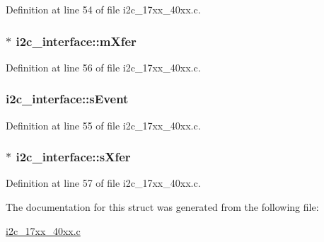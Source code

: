 Definition at line 54 of file i2c\+\_\+17xx\+\_\+40xx.\+c.

\subsubsection[{\texorpdfstring{m\+Xfer}{mXfer}}]{$\ast$ i2c\+\_\+interface\+::m\+Xfer}\hypertarget{structi2c__interface_a8894534cc883275b847f183e6fe1e7e6}{}\label{structi2c__interface_a8894534cc883275b847f183e6fe1e7e6}


Definition at line 56 of file i2c\+\_\+17xx\+\_\+40xx.\+c.

\subsubsection[{\texorpdfstring{s\+Event}{sEvent}}]{ i2c\+\_\+interface\+::s\+Event}\hypertarget{structi2c__interface_aa0820cc1e59b1da898435b4813f5c58d}{}\label{structi2c__interface_aa0820cc1e59b1da898435b4813f5c58d}


Definition at line 55 of file i2c\+\_\+17xx\+\_\+40xx.\+c.

\subsubsection[{\texorpdfstring{s\+Xfer}{sXfer}}]{$\ast$ i2c\+\_\+interface\+::s\+Xfer}\hypertarget{structi2c__interface_a891a1ea53436714c117aaa2d0917e9f2}{}\label{structi2c__interface_a891a1ea53436714c117aaa2d0917e9f2}


Definition at line 57 of file i2c\+\_\+17xx\+\_\+40xx.\+c.



The documentation for this struct was generated from the following file\+:\begin{DoxyCompactItemize}
\item 
\hyperlink{i2c__17xx__40xx_8c}{i2c\+\_\+17xx\+\_\+40xx.\+c}\end{DoxyCompactItemize}
